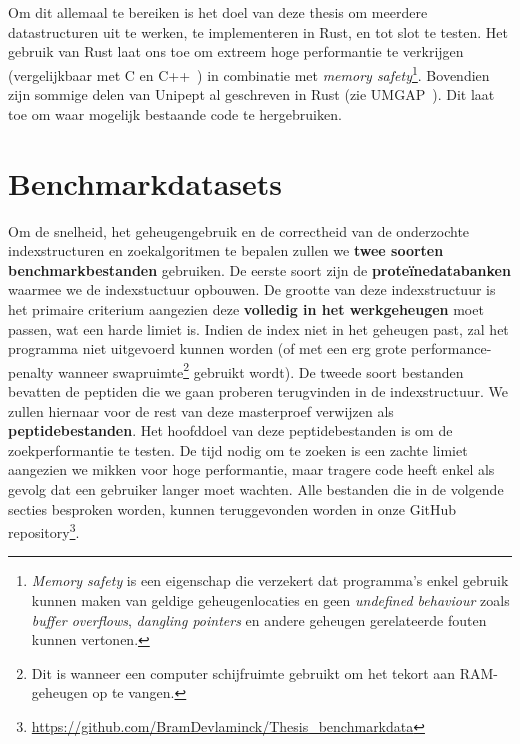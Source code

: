 \\ \\
Om dit allemaal te bereiken is het doel van deze thesis om meerdere datastructuren uit te werken, te implementeren in Rust, en tot slot te testen.
Het gebruik van Rust laat ons toe om extreem hoge performantie te verkrijgen (vergelijkbaar met C en C++~\cite{rustPerformantie}) in combinatie met \textit{memory safety}\footnote{\textit{Memory safety} is een eigenschap die verzekert dat programma's enkel gebruik kunnen maken van geldige geheugenlocaties en geen \textit{undefined behaviour} zoals \textit{buffer overflows}, \textit{dangling pointers} en andere geheugen gerelateerde fouten kunnen vertonen.}.
Bovendien zijn sommige delen van Unipept al geschreven in Rust (zie UMGAP~\cite{UMGAP_paper, UMGAP_source}).
Dit laat toe om waar mogelijk bestaande code te hergebruiken.


\section{Benchmarkdatasets}\label{sec:datasets}
Om de snelheid, het geheugengebruik en de correctheid van de onderzochte indexstructuren en zoekalgoritmen te bepalen zullen we \textbf{twee soorten benchmarkbestanden} gebruiken.
De eerste soort zijn de \textbf{proteïnedatabanken} waarmee we de indexstuctuur opbouwen.
De grootte van deze indexstructuur is het primaire criterium aangezien deze \textbf{volledig in het werkgeheugen} moet passen, wat een harde limiet is.
Indien de index niet in het geheugen past, zal het programma niet uitgevoerd kunnen worden (of met een erg grote performance-penalty wanneer swapruimte\footnote{Dit is wanneer een computer schijfruimte gebruikt om het tekort aan RAM-geheugen op te vangen.} gebruikt wordt).
De tweede soort bestanden bevatten de peptiden die we gaan proberen terugvinden in de indexstructuur.
We zullen hiernaar voor de rest van deze masterproef verwijzen als \textbf{peptidebestanden}.
Het hoofddoel van deze peptidebestanden is om de zoekperformantie te testen.
De tijd nodig om te zoeken is een zachte limiet aangezien we mikken voor hoge performantie, maar tragere code heeft enkel als gevolg dat een gebruiker langer moet wachten.
Alle bestanden die in de volgende secties besproken worden, kunnen teruggevonden worden in onze GitHub repository\footnote{\url{https://github.com/BramDevlaminck/Thesis_benchmarkdata}}.


